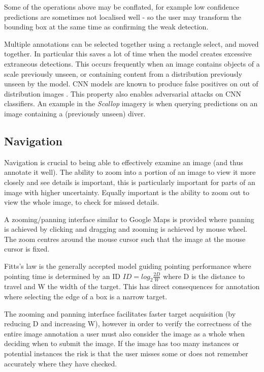 Some of the operations above may be conflated, for example low confidence predictions are sometimes not localised well - so the user may transform the bounding box at the same time as confirming the weak detection.


Multiple annotations can be selected together using a rectangle select, and moved together. In particular this saves a lot of time when the model creates excessive extraneous detections. This occurs frequently when an image contains objects of a scale previously unseen, or containing content from a distribution previously unseen by the model. \gls{CNN} models are known to produce false positives on out of distribution images \cite{Hendrycks2016,Lee2018}. This property also enables adversarial attacks on \gls{CNN} classifiers. An example in the \emph{Scallop} imagery is when querying predictions on an image containing a (previously unseen) diver.



\subsection {Navigation}

Navigation is crucial to being able to effectively examine an image (and thus annotate it well). The ability to zoom into a portion of an image to view it more closely and see details is important, this is particularly important for parts of an image with higher uncertainty. Equally important is the ability to zoom out to view the whole image, to check for missed details. 

A zooming/panning interface similar to Google Maps is provided where panning is achieved by clicking and dragging and zooming is achieved by mouse wheel. The zoom centres around the mouse cursor such that the image at the mouse cursor is fixed.

Fitts's law is the generally accepted model guiding pointing performance where pointing time is determined by an \gls{ID} $ ID = log_2 \frac{2D}{W} $ where D is the distance to travel and W the width of the target. This has direct consequences for annotation where selecting the edge of a box is a narrow target. 

The zooming and panning interface facilitates faster target acquisition (by reducing D and increasing W), however in order to verify the correctness of the entire image annotation a user must also consider the image as a whole when deciding when to submit the image. If the image has too many instances or potential instances the risk is that the user misses some or does not remember accurately where they have checked. 



